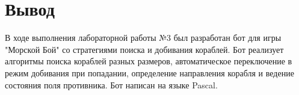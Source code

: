 \documentclass[oneside,a4paper,14pt]{extarticle}
\begin{document}
\newpage

\section*{Вывод}

В ходе выполнения лабораторной работы №3 был разработан бот для игры "Морской Бой" со стратегиями поиска и добивания кораблей. Бот реализует алгоритмы поиска кораблей разных размеров, автоматическое переключение в режим добивания при попадании, определение направления корабля и ведение состояния поля противника. Бот написан на языке Pascal.
\end{document}
